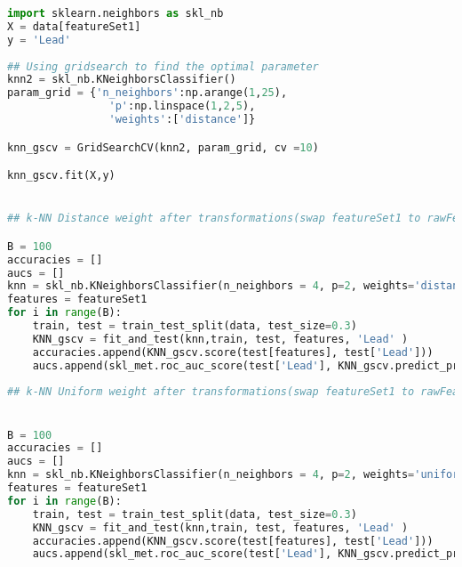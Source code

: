 \documentclass[../../project.tex]{subfiles}
\begin{document}
	\begin{lstlisting}[language=Python]
import sklearn.neighbors as skl_nb
X = data[featureSet1]	
y = 'Lead'
	
## Using gridsearch to find the optimal parameter
knn2 = skl_nb.KNeighborsClassifier()
param_grid = {'n_neighbors':np.arange(1,25),
                'p':np.linspace(1,2,5),
                'weights':['distance']}

knn_gscv = GridSearchCV(knn2, param_grid, cv =10)

knn_gscv.fit(X,y)


## k-NN Distance weight after transformations(swap featureSet1 to rawFeatures for before transformations)

B = 100
accuracies = []
aucs = []
knn = skl_nb.KNeighborsClassifier(n_neighbors = 4, p=2, weights='distance')
features = featureSet1
for i in range(B):
    train, test = train_test_split(data, test_size=0.3)
    KNN_gscv = fit_and_test(knn,train, test, features, 'Lead' )
    accuracies.append(KNN_gscv.score(test[features], test['Lead']))
    aucs.append(skl_met.roc_auc_score(test['Lead'], KNN_gscv.predict_proba(test[features])[:,1]))
    
## k-NN Uniform weight after transformations(swap featureSet1 to rawFeatures for before transformations)


B = 100
accuracies = []
aucs = []
knn = skl_nb.KNeighborsClassifier(n_neighbors = 4, p=2, weights='uniform')
features = featureSet1
for i in range(B):
    train, test = train_test_split(data, test_size=0.3)
    KNN_gscv = fit_and_test(knn,train, test, features, 'Lead' )
    accuracies.append(KNN_gscv.score(test[features], test['Lead']))
    aucs.append(skl_met.roc_auc_score(test['Lead'], KNN_gscv.predict_proba(test[features])[:,1]))

	
	
		\end{lstlisting}
\end{document}
